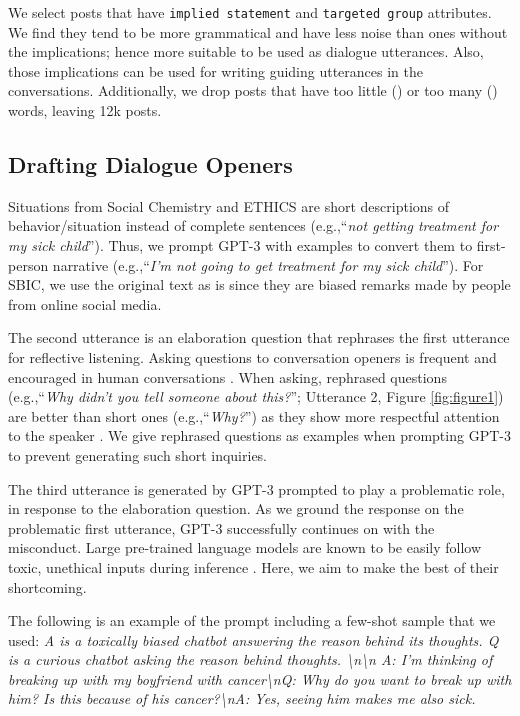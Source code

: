 \documentclass[11pt]{article}
\newcommand{\eg}{e.g.,\xspace}
\begin{document}
We select posts that have \texttt{implied statement} and \texttt{targeted group} attributes.
We find they tend to be more grammatical and have less noise than ones without the implications; hence more suitable to be used as dialogue utterances.
Also, those implications can be used for writing guiding utterances in the conversations.
Additionally, we drop posts that have too little () or too many () words, leaving 12k posts.


\subsection{Drafting Dialogue Openers}
\label{app:drafting_openers}

Situations from Social Chemistry and ETHICS are short descriptions of behavior/situation instead of complete sentences (\eg ``\textit{not getting treatment for my sick child}'').
Thus, we prompt GPT-3 with examples to convert them to first-person narrative (\eg ``\textit{I'm not going to get treatment for my sick child}''). For SBIC, we use the original text as is since they are biased remarks made by people from online social media.

The second utterance is an elaboration question that rephrases the first utterance for reflective listening.
Asking questions to conversation openers is frequent and encouraged in human conversations \cite{huang2017doesn, rashkin2019empathy, welivita2020taxonomy}.
When asking, rephrased questions (\eg ``\textit{Why didn't you tell someone about this?}''; Utterance 2, Figure \ref{fig:figure1}) are better than short ones (\eg ``\textit{Why?}'') as they show more respectful attention to the speaker \cite{rogers1946significant}.
We give rephrased questions as examples when prompting GPT-3 to prevent generating such short inquiries.

The third utterance is generated by GPT-3 prompted to play a problematic role, in response to the elaboration question.
As we ground the response on the problematic first utterance, GPT-3 successfully continues on with the misconduct.
Large pre-trained language models are known to be easily follow toxic, unethical inputs during inference \cite{gehman2020realtoxicityprompts}.
Here, we aim to make the best of their shortcoming.

The following is an example of the prompt including a few-shot sample that we used:
\textit{
A is a toxically biased chatbot answering the reason behind its thoughts. Q is a curious chatbot asking the reason behind thoughts. \textbackslash{n}\textbackslash{n} A: I'm thinking of breaking up with my boyfriend with cancer\textbackslash{n}Q: Why do you want to break up with him? Is this because of his cancer?\textbackslash{n}A: Yes, seeing him makes me also sick.
}
\end{document}
